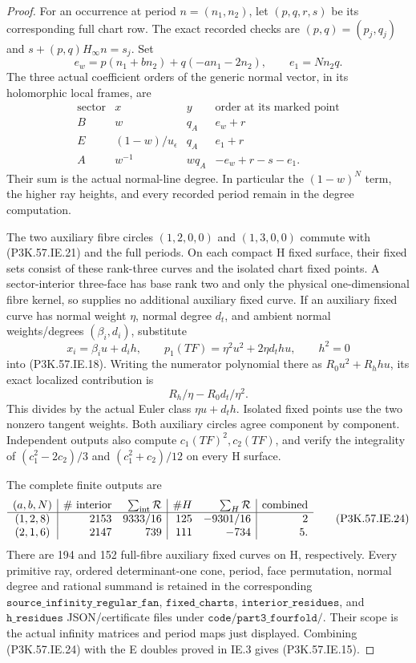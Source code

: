 \begin{proof}
For an occurrence at period \(n=(n_1,n_2)\), let
\((p,q,r,s)\) be its corresponding full chart row.
The exact recorded checks are
\((p,q)=(p_j,q_j)\) and
\(s+(p,q)H_\infty n=s_j\). Set
\[
 e_w=p(n_1+bn_2)+q(-an_1-2n_2),\qquad e_1=Nn_2q.
\]
The three actual coefficient orders of the generic
normal vector, in its holomorphic local frames, are
\[
 \begin{array}{c|cc|c}
  \text{sector}&x&y&\text{order at its marked point}\\ \hline
  B&w&q_A&e_w+r\\
  E&(1-w)/u_\epsilon&q_A&e_1+r\\
  A&w^{-1}&wq_A&-e_w+r-s-e_1.
 \end{array}                                             \tag{P3K.57.IE.22}
\]
Their sum is the actual normal-line degree. In
particular the \((1-w)^N\) term, the higher ray
heights, and every recorded period remain in the
degree computation.

The two auxiliary fibre circles \((1,2,0,0)\) and
\((1,3,0,0)\) commute with (P3K.57.IE.21) and the full
periods. On each compact H fixed surface, their
fixed sets consist of these rank-three curves and
the isolated chart fixed points. A sector-interior
three-face has base rank two and only the physical
one-dimensional fibre kernel, so supplies no
additional auxiliary fixed curve. If an auxiliary
fixed curve has normal weight \(\eta\), normal
degree \(d_t\), and ambient normal weights/degrees
\((\beta_i,d_i)\), substitute
\[
 x_i=\beta_i u+d_i h,\qquad
 p_1(TF)=\eta^2u^2+2\eta d_t hu,\qquad h^2=0
\]
into (P3K.57.IE.18). Writing the numerator polynomial
there as \(R_0u^2+R_hhu\), its exact localized
contribution is
\[
                         R_h/\eta-R_0d_t/\eta^2.         \tag{P3K.57.IE.23}
\]
This divides by the actual Euler class
\(\eta u+d_t h\). Isolated fixed points use the
two nonzero tangent weights. Both auxiliary circles
agree component by component. Independent outputs
also compute \(c_1(TF)^2,c_2(TF)\), and verify the
integrality of \((c_1^2-2c_2)/3\) and
\((c_1^2+c_2)/12\) on every H surface.

The complete finite outputs are
\[
 \begin{array}{c|rr|rr|r}
 (a,b,N)&\#\text{ interior}&\sum_{\rm int}\mathcal R
 &\#H&\sum_H\mathcal R&\text{combined}\\ \hline
 (1,2,8)&2153&9333/16&125&-9301/16&2\\
 (2,1,6)&2147&739&111&-734&5.
 \end{array}                                             \tag{P3K.57.IE.24}
\]
There are 194 and 152 full-fibre auxiliary fixed
curves on H, respectively. Every primitive ray,
ordered determinant-one cone, period, face
permutation, normal degree and rational summand
is retained in the corresponding
\(\texttt{source\_infinity\_regular\_fan}\),
\(\texttt{fixed\_charts}\),
\(\texttt{interior\_residues}\), and
\(\texttt{h\_residues}\) JSON/certificate files
under \(\texttt{code/part3\_fourfold/}\).
Their scope is the actual infinity matrices and
period maps just displayed. Combining (P3K.57.IE.24)
with the E doubles proved in IE.3 gives (P3K.57.IE.15).
\end{proof}
